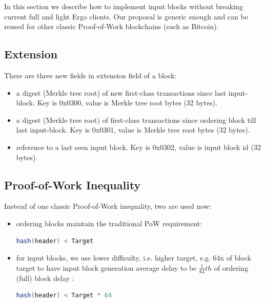 \documentclass{llncs}
\begin{document}
In this section we describe how to implement input blocks without breaking current full and light Ergo clients. Our
proposal is generic enough and can be reused for other classic Proof-of-Work blockchains (such as Bitcoin).

\subsection{Extension}
\label{subsec:extension}

There are three new fields in extension field of a block:
\begin{itemize}
  \item a digest (Merkle tree root) of new first-class transactions since last input-block. Key is 0x0300,
        value is Merkle tree root bytes (32 bytes).
  \item a digest (Merkle tree root) of first-class transactions since ordering block till last input-block. Key is 0x0301,
  value is Merkle tree root bytes (32 bytes).
  \item reference to a last seen input block. Key is 0x0302, value is input block id (32 bytes).
\end{itemize}



\subsection{Proof-of-Work Inequality}
\label{subsec:pow-inequality}

Instead of one classic Proof-of-Work inequality, two are used now:

\begin{itemize}

\item{} ordering blocks maintain the traditional PoW requirement:

\begin{lstlisting}[language=Scala]
  hash(header) < Target
\end{lstlisting}

\item{} for input blocks, we use lower  difficulty, i.e. higher target, e.g. 64x of block target to have input block
generation average delay to be $\frac{1}{64} th$ of ordering (full) block delay :

\begin{lstlisting}[language=Scala]
  hash(header) < Target * 64
\end{lstlisting}

\end{itemize}
\end{document}
